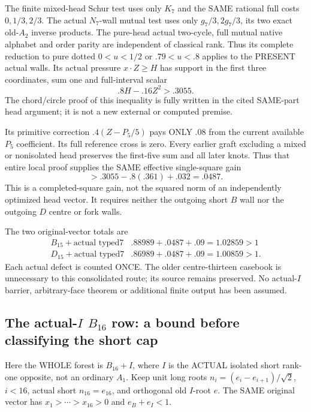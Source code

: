 The finite mixed-head Schur test uses
only \(K_7\) and the SAME rational full
costs \(0,1/3,2/3\).
The actual \(N_7\)-wall mutual test uses
only \(g_7/3,2g_7/3\), its two exact
old-\(A_2\) inverse products.
The pure-head actual two-cycle, full
mutual native alphabet and order parity
are independent of classical rank.
Thus its complete reduction to pure
dotted \(0<u<1/2\) or \(.79<u<.8\)
applies to the PRESENT actual walls.
Its actual pressure \(x\cdot Z\ge H\)
has support in the first three coordinates,
sum one and full-interval scalar
\[
                            .8H-.16Z^2>.3055 .
\]
The chord/circle proof of this inequality
is fully written in the cited SAME-part
head argument; it is not a new external
or computed premise.

Its primitive correction \(.4(Z-P_5/5)\)
pays ONLY \(.08\) from the current available
\(P_5\) coefficient.
Its full reference cross is zero.
Every earlier graft excluding a mixed
or nonisolated head preserves the first-five
sum and all later knots.
Thus that entire local proof supplies the
SAME effective single-square gain
\[
                          >.3055-.8(.361)+.032=.0487 .
\]
This is a completed-square gain, not the
squared norm of an independently optimized
head vector.
It requires neither the outgoing short
\(B\) wall nor the outgoing \(D\) centre
or fork walls.

The two original-vector totals are
\[
 \begin{array}{c|c}
 B_{15}+\text{actual typed7}&.88989+.0487+.09=1.02859>1\\
 D_{15}+\text{actual typed7}&.86989+.0487+.09=1.00859>1 .
 \end{array}
\]
Each actual defect is counted ONCE.
The older centre-thirteen casebook is
unnecessary to this consolidated route;
its source remains preserved.
No actual-\(I\) barrier, arbitrary-face
theorem or additional finite output
has been assumed.

\subsection{The actual-\(I\) \(B_{16}\) row: a bound before classifying the short cap}
\label{app:arithB16Ishort}

Here the WHOLE forest is \(B_{16}+I\),
where \(I\) is the ACTUAL isolated short
rank-one opposite, not an ordinary \(A_1\).
Keep unit long roots
\(n_i=(e_i-e_{i+1})/\sqrt2\), \(i<16\),
actual short \(n_{16}=e_{16}\), and
orthogonal old \(I\)-root \(e\).
The SAME original vector has
\(x_1>\cdots>x_{16}>0\) and
\(e_B+e_I<1\).

